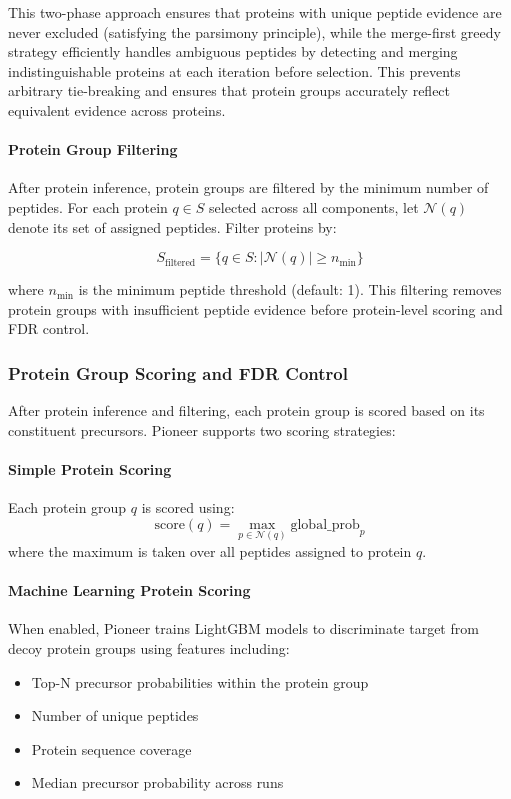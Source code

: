 \documentclass{article}
\begin{document}
This two-phase approach ensures that proteins with unique peptide evidence are never excluded (satisfying the parsimony principle), while the merge-first greedy strategy efficiently handles ambiguous peptides by detecting and merging indistinguishable proteins at each iteration before selection. This prevents arbitrary tie-breaking and ensures that protein groups accurately reflect equivalent evidence across proteins.

\paragraph{Protein Group Filtering} After protein inference, protein groups are filtered by the minimum number of peptides. For each protein $q \in S$ selected across all components, let $\mathcal{N}(q)$ denote its set of assigned peptides. Filter proteins by:

\begin{equation}
S_{\text{filtered}} = \{q \in S : |\mathcal{N}(q)| \geq n_{\text{min}}\}
\end{equation}

where $n_{\text{min}}$ is the minimum peptide threshold (default: 1). This filtering removes protein groups with insufficient peptide evidence before protein-level scoring and FDR control.

\subsubsection{Protein Group Scoring and FDR Control}

After protein inference and filtering, each protein group is scored based on its constituent precursors. Pioneer supports two scoring strategies:

\paragraph{Simple Protein Scoring} Each protein group $q$ is scored using:
\begin{equation}
\text{score}(q) = \max_{p \in \mathcal{N}(q)} \text{global\_prob}_p
\end{equation}
where the maximum is taken over all peptides assigned to protein $q$.

\paragraph{Machine Learning Protein Scoring} When enabled, Pioneer trains LightGBM models to discriminate target from decoy protein groups using features including:
\begin{itemize}
  \item Top-N precursor probabilities within the protein group
  \item Number of unique peptides
  \item Protein sequence coverage
  \item Median precursor probability across runs
\end{itemize}
\end{document}
